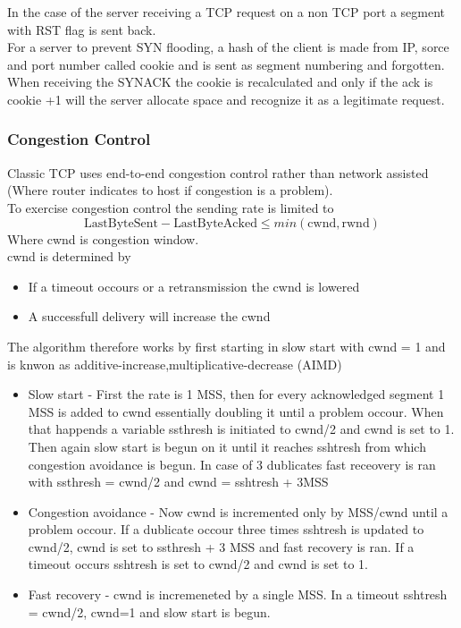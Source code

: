 \documentclass[12pt, a4paper]{article}
\begin{document}
				In the case of the server receiving a TCP request on a non TCP port a segment with RST flag is sent back.\\
				For a server to prevent SYN flooding, a hash of the client is made from IP, sorce and port number called cookie and is sent as segment numbering and forgotten.\\
				When receiving the SYNACK the cookie is recalculated and only if the ack is cookie +1 will the server allocate space and recognize it as a legitimate request.\\
			\subsubsection{Congestion Control}
				Classic TCP uses end-to-end congestion control rather than network assisted (Where router indicates to host if congestion is a problem).\\
				To exercise congestion control the sending rate is limited to
				$$\text{LastByteSent} - \text{LastByteAcked} \leq min(\text{cwnd},\text{rwnd})$$
				Where cwnd is congestion window.\\
				cwnd is determined by
				\begin{itemize}
					\item If a timeout occours or a retransmission the cwnd is lowered
					\item A successfull delivery will increase the cwnd
				\end{itemize}
				The algorithm therefore works by first starting in slow start with cwnd = 1 and is knwon as additive-increase,multiplicative-decrease (AIMD)
				\begin{itemize}
					\item Slow start - First the rate is 1 MSS, then for every acknowledged segment 1 MSS is added to cwnd essentially doubling it until a problem occour. When that happends a variable ssthresh is initiated to cwnd/2 and cwnd is set to 1. Then again slow start is begun on it until it reaches sshtresh from which congestion avoidance is begun. In case of 3 dublicates fast receovery is ran with ssthresh = cwnd/2 and cwnd = sshtresh + 3MSS
					\item Congestion avoidance - Now cwnd is incremented only by MSS/cwnd until a problem occour. If a dublicate occour three times sshtresh is updated to cwnd/2, cwnd is set to ssthresh + 3 MSS and fast recovery is ran. If a timeout occurs sshtresh is set to cwnd/2 and cwnd is set to 1.
					\item Fast recovery - cwnd is incremeneted by a single MSS. In a timeout sshtresh = cwnd/2, cwnd=1 and slow start is begun.
				\end{itemize}
\end{document}
